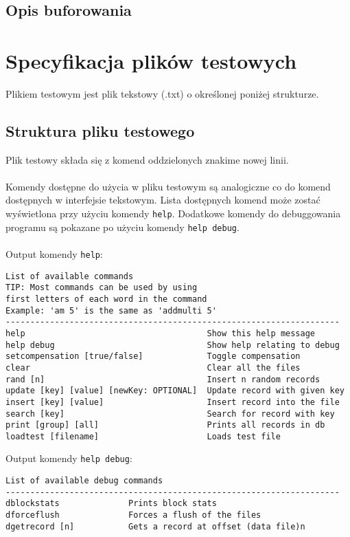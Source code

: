 \documentclass[12pt]{article}
\begin{document}
\subsection{Opis buforowania}
 
\section{Specyfikacja plików testowych}
Plikiem testowym jest plik tekstowy (.txt) o określonej poniżej strukturze.
\subsection{Struktura pliku testowego}
Plik testowy składa się z komend oddzielonych znakime nowej linii.
\\\\
Komendy dostępne do użycia w pliku testowym są analogiczne co do komend dostępnych w interfejsie tekstowym.
Lista dostępnych komend może zostać wyświetlona przy użyciu komendy \verb!help!. Dodatkowe komendy do debuggowania
programu są pokazane po użyciu komendy \verb!help debug!.
\\\\
Output komendy \verb!help!:

\begin{tcolorbox}[colframe=black!75, colback=white!95, title=Output komendy \texttt{help}]
\begin{verbatim}
List of available commands
TIP: Most commands can be used by using 
first letters of each word in the command
Example: 'am 5' is the same as 'addmulti 5'
--------------------------------------------------------------------
help                                     Show this help message
help debug                               Show help relating to debug
setcompensation [true/false]             Toggle compensation
clear                                    Clear all the files
rand [n]                                 Insert n random records
update [key] [value] [newKey: OPTIONAL]  Update record with given key
insert [key] [value]                     Insert record into the file
search [key]                             Search for record with key
print [group] [all]                      Prints all records in db
loadtest [filename]                      Loads test file
\end{verbatim}
\end{tcolorbox}

Output komendy \verb!help debug!:

\begin{tcolorbox}[colframe=black!75, colback=white!95, title=Output komendy \texttt{help debug}]
\begin{verbatim}
List of available debug commands
--------------------------------------------------------------------
dblockstats              Prints block stats
dforceflush              Forces a flush of the files
dgetrecord [n]           Gets a record at offset (data file)n
\end{verbatim}
\end{tcolorbox}
\end{document}
